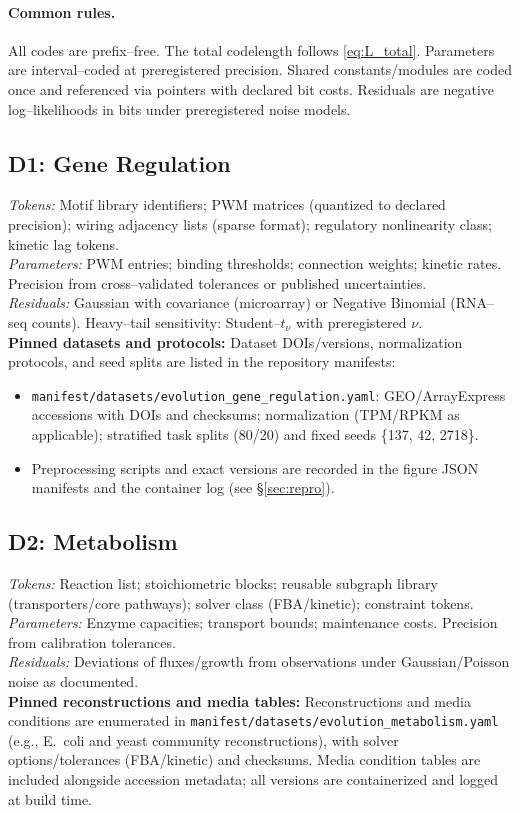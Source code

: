 \documentclass[11pt,a4paper]{article}
\begin{document}
\paragraph{Common rules.}
All codes are prefix–free. The total codelength follows \eqref{eq:L_total}. Parameters are interval–coded at preregistered precision. Shared constants/modules are coded once and referenced via pointers with declared bit costs. Residuals are negative log–likelihoods in bits under preregistered noise models.

\subsection*{D1: Gene Regulation}
\emph{Tokens:} Motif library identifiers; PWM matrices (quantized to declared precision); wiring adjacency lists (sparse format); regulatory nonlinearity class; kinetic lag tokens.\\
\emph{Parameters:} PWM entries; binding thresholds; connection weights; kinetic rates. Precision from cross–validated tolerances or published uncertainties.\\
\emph{Residuals:} Gaussian with covariance (microarray) or Negative Binomial (RNA–seq counts). Heavy–tail sensitivity: Student–$t_\nu$ with preregistered $\nu$.\\
\textbf{Pinned datasets and protocols:} Dataset DOIs/versions, normalization protocols, and seed splits are listed in the repository manifests:
\begin{itemize}[leftmargin=*]
  \item \texttt{manifest/datasets/evolution\_gene\_regulation.yaml}: GEO/ArrayExpress accessions with DOIs and checksums; normalization (TPM/RPKM as applicable); stratified task splits (80/20) and fixed seeds \{137, 42, 2718\}.
  \item Preprocessing scripts and exact versions are recorded in the figure JSON manifests and the container log (see \S\ref{sec:repro}).
\end{itemize}

\subsection*{D2: Metabolism}
\emph{Tokens:} Reaction list; stoichiometric blocks; reusable subgraph library (transporters/core pathways); solver class (FBA/kinetic); constraint tokens.\\
\emph{Parameters:} Enzyme capacities; transport bounds; maintenance costs. Precision from calibration tolerances.\\
\emph{Residuals:} Deviations of fluxes/growth from observations under Gaussian/Poisson noise as documented.\\
\textbf{Pinned reconstructions and media tables:} Reconstructions and media conditions are enumerated in \texttt{manifest/datasets/evolution\_metabolism.yaml} (e.g., E.\ coli and yeast community reconstructions), with solver options/tolerances (FBA/kinetic) and checksums. Media condition tables are included alongside accession metadata; all versions are containerized and logged at build time.
\end{document}
